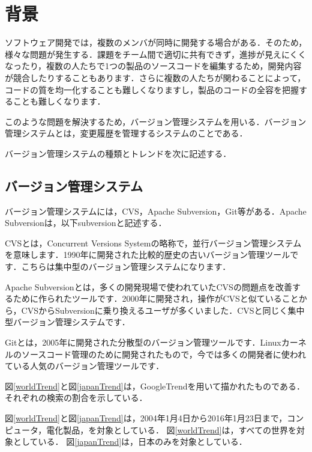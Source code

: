 \chapter{背景}

ソフトウェア開発では，複数のメンバが同時に開発する場合がある．そのため，様々な問題が発生する．課題をチーム間で適切に共有できず，進捗が見えにくくなったり，複数の人たちで1つの製品のソースコードを編集するため，開発内容が競合したりすることもあります．さらに複数の人たちが関わることによって，コードの質を均一化することも難しくなりますし，製品のコードの全容を把握することも難しくなります\cite{ikeda2014}．

このような問題を解決するため，バージョン管理システムを用いる．バージョン管理システムとは，変更履歴を管理するシステムのことである．

バージョン管理システムの種類とトレンドを次に記述する．
\section{バージョン管理システム}

バージョン管理システムには，CVS，Apache Subversion，Git等がある．Apache Subversionは，以下subversionと記述する．

CVSとは，Concurrent Versions Systemの略称で，並行バージョン管理システムを意味します．1990年に開発された比較的歴史の古いバージョン管理ツールです．こちらは集中型のバージョン管理システムになります\cite{matsuda2015}．

Apache Subversionとは，多くの開発現場で使われていたCVSの問題点を改善するために作られたツールです．2000年に開発され，操作がCVSと似ていることから，CVSからSubversionに乗り換えるユーザが多くいました．CVSと同じく集中型バージョン管理システムです\cite{matsuda2015}．

Gitとは，2005年に開発された分散型のバージョン管理ツールです．Linuxカーネルのソースコード管理のために開発されたもので，今では多くの開発者に使われている人気のバージョン管理ツールです\cite{matsuda2015}．


図\ref{worldTrend}と図\ref{japanTrend}は，GoogleTrendを用いて描かれたものである．それぞれの検索の割合を示している．

図\ref{worldTrend}と図\ref{japanTrend}は，2004年1月4日から2016年1月23日まで，コンピュータ，電化製品，を対象としている．
図\ref{worldTrend}は，すべての世界を対象としている．
図\ref{japanTrend}は，日本のみを対象としている．

